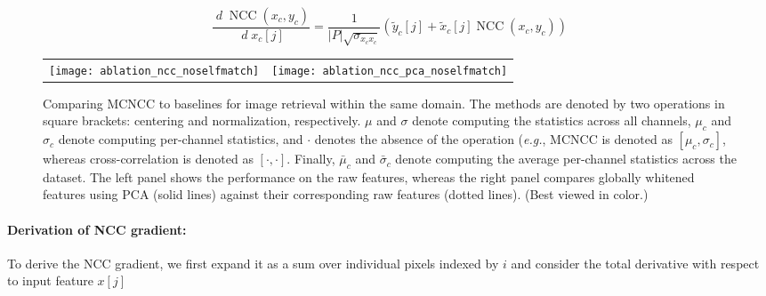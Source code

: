 \documentclass[twocolumn]{svjour3}           %
\newcommand{\eg}{\emph{e.g.}}
\DeclareMathOperator{\total}{\mathit{d}}
\begin{document}
{\scriptsize
\begin{equation}
  \frac{\total\operatorname{NCC}(x_c,y_c)}{\total x_c[j]} =
  \frac{1}{|P|\sqrt{\sigma_{x_cx_c}}}
  ( \tilde{y}_c[j]+ \tilde{x}_c[j] \operatorname{NCC}(x_c,y_c) )
\end{equation}}

\begin{figure*}[t]
  \begin{center}
  \begin{tabular}{cc}
    \texttt{[image: ablation\_ncc\_noselfmatch]} &
    \texttt{[image: ablation\_ncc\_pca\_noselfmatch]}
  \end{tabular}\vspace{-2mm}
  \end{center}
  \caption{Comparing MCNCC to baselines for image retrieval within the same
  domain. The methods are denoted by two
  operations in square brackets: centering and normalization,
  respectively. $\mu$ and $\sigma$ denote computing the statistics across all
  channels, $\mu_c$ and $\sigma_c$ denote computing per-channel statistics, and
  $\cdot$ denotes the absence of the operation (\eg, MCNCC is denoted as
  $[\mu_c,\sigma_c]$, whereas cross-correlation is denoted as $[\cdot,\cdot]$.
  Finally, $\bar{\mu}_c$ and $\bar{\sigma}_c$ denote computing the average
  per-channel statistics across the dataset.
  The left panel shows the performance on the raw features, whereas the
  right panel compares globally whitened features using PCA (solid lines) against
  their corresponding raw features (dotted lines). (Best viewed in color.)}
  \label{fig:ncc_ablation}
\end{figure*}


\paragraph{Derivation of NCC gradient:} To derive the NCC gradient, we first
expand it as a sum over individual pixels indexed by $i$ and consider the total
derivative with respect to input feature $x[j]$
\end{document}
